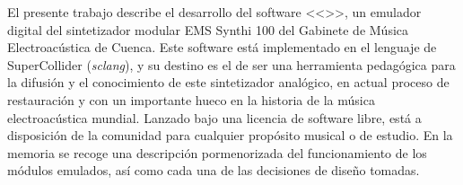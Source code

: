 El presente trabajo describe el desarrollo del software <<\appName>>, un emulador digital del sintetizador modular EMS Synthi 100 del Gabinete de Música Electroacústica de Cuenca. Este software está implementado en el lenguaje de SuperCollider (\textit{sclang}), y su destino es el de ser una herramienta pedagógica para la difusión y el conocimiento de este sintetizador analógico, en actual proceso de restauración y con un importante hueco en la historia de la música electroacústica mundial. Lanzado bajo una licencia de software libre, está a disposición de la comunidad para cualquier propósito musical o de estudio. En la memoria se recoge una descripción pormenorizada del funcionamiento de los módulos emulados, así como cada una de las decisiones de diseño tomadas.
\\[1.5cm]
